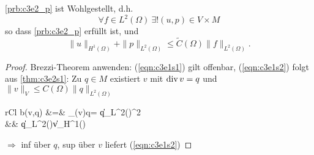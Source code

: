 \documentclass[../skript.tex]{subfiles}
\begin{document}
\begin{theorem}\label{thm:c3e2s2}
	\cref{prb:c3e2_p} ist Wohlgestellt, d.h.
	\[
		\forall f\in L^2(\Omega)\:\exists! (u,p)\in V\times M
	\]
	so dass \cref{prb:c3e2_p} erfüllt ist, und
	\[
		\|u\|_{H^1(\Omega)} + \|p\|_{L^2(\Omega)} \leq \tilde{C}(\Omega) \|f\|_{L^2(\Omega)}.
	\]
\end{theorem}

\begin{proof}
	Brezzi-Theorem anwenden: (\ref{eqn:c3e1s1}) gilt offenbar, (\ref{eqn:c3e1s2}) folgt aus \cref{thm:c3e2s1}:\newline\noindent
	Zu $q\in M$ existiert $v$ mit $\operatorname{div} v = q$ und $\|v\|_V\leq C(\Omega)\|q\|_{L^2(\Omega)}$
	\begin{IEEEeqnarray*}{rCl}
		b(v,q) &=& \int_\Omega (\dive v)\:q\dx = \|q\|_{L^2(\Omega)}^2\\
		&\geq& \|q\|_{L^2(\Omega)}\|v\|_{H^1(\Omega)}
	\end{IEEEeqnarray*}
	$\Rightarrow$ inf über $q$, sup über $v$ liefert (\ref{eqn:c3e1s2})
\end{proof}
\end{document}
